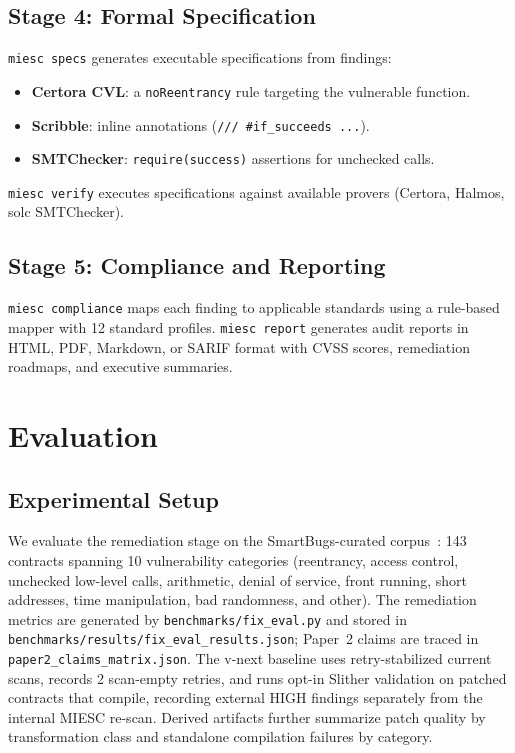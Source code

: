 \documentclass[conference]{IEEEtran}
\begin{document}
\subsection{Stage 4: Formal Specification}

\texttt{miesc specs} generates executable specifications from findings:
\begin{itemize}
    \item \textbf{Certora CVL}: a \texttt{noReentrancy} rule targeting the vulnerable function.
    \item \textbf{Scribble}: inline annotations (\texttt{/// \#if\_succeeds ...}).
    \item \textbf{SMTChecker}: \texttt{require(success)} assertions for unchecked calls.
\end{itemize}

\texttt{miesc verify} executes specifications against available provers (Certora, Halmos, solc SMTChecker).

\subsection{Stage 5: Compliance and Reporting}

\texttt{miesc compliance} maps each finding to applicable standards using a rule-based mapper with 12 standard profiles. \texttt{miesc report} generates audit reports in HTML, PDF, Markdown, or SARIF format with CVSS scores, remediation roadmaps, and executive summaries.

\section{Evaluation}

\subsection{Experimental Setup}

We evaluate the remediation stage on the SmartBugs-curated corpus~\cite{ferreira2020smartbugs}: 143 contracts spanning 10 vulnerability categories (reentrancy, access control, unchecked low-level calls, arithmetic, denial of service, front running, short addresses, time manipulation, bad randomness, and other). The remediation metrics are generated by \texttt{benchmarks/fix\_eval.py} and stored in \texttt{benchmarks/results/fix\_eval\_results.json}; Paper~2 claims are traced in \texttt{paper2\_claims\_matrix.json}. The v-next baseline uses retry-stabilized current scans, records 2 scan-empty retries, and runs opt-in Slither validation on patched contracts that compile, recording external HIGH findings separately from the internal MIESC re-scan. Derived artifacts further summarize patch quality by transformation class and standalone compilation failures by category.
\end{document}
